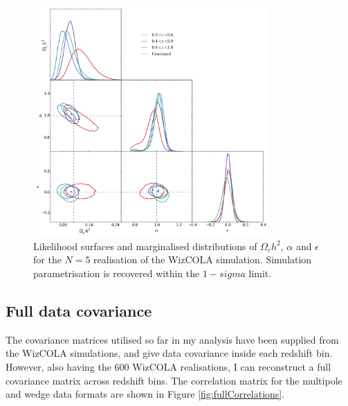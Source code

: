 \documentclass[titlesmallcaps, examinerscopy, copyrightpage]{uqthesis}
\begin{document}
\begin{figure}[h!]
  \begin{center}
    \includegraphics[width=0.8\textwidth]{images/corCombinedMp5.pdf}
  \end{center}
  \caption{Likelihood surfaces and marginalised distributions of $\Omega_ch^2$, $\alpha$ and $\epsilon$ for the $N=5$ realisation of the WizCOLA simulation. Simulation parametrisation is recovered within the $1-sigma$ limit.}
  \label{fig:corCombined_2}
\end{figure}




\subsection{Full data covariance} \label{sec:allData}

The covariance matrices utilised so far in my analysis have been supplied from the WizCOLA simulations, and give data covariance inside each redshift bin. However, also having the 600 WizCOLA realisations, I can reconstruct a full covariance matrix across redshift bins. The correlation matrix for the multipole and wedge data formats are shown in Figure \ref{fig:fullCorrelations}.\\
\end{document}
